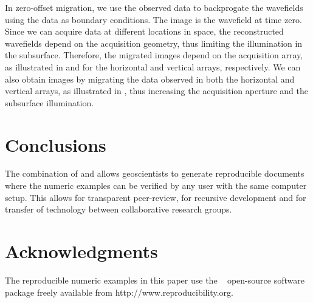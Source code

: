 
In zero-offset migration, we use the observed data to backprogate the
wavefields using the data as boundary conditions. The image is the
wavefield at time zero. Since we can acquire data at different
locations in space, the reconstructed wavefields depend on the
acquisition geometry, thus limiting the illumination in the
subsurface. Therefore, the migrated images depend on the acquisition
array, as illustrated in  and  for the horizontal
and vertical arrays, respectively. 
We can also obtain images by migrating the data observed in both the
horizontal and vertical arrays, as illustrated in , thus
increasing the acquisition aperture and the subsurface illumination.



\section{Conclusions}
The combination of \latex and \mg allows geoscientists to generate
reproducible documents where the numeric examples can be verified by
any user with the same computer setup. This allows for transparent
peer-review, for recursive development and for transfer of technology
between collaborative research groups.

\section{Acknowledgments}
The reproducible numeric examples in this paper use the \mg~
open-source software package freely available from
http://www.reproducibility.org.


